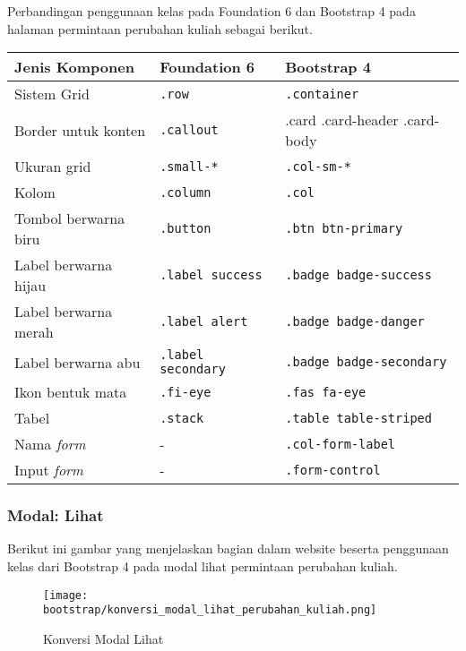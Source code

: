 \noindent Perbandingan penggunaan kelas pada Foundation 6 dan Bootstrap 4 pada halaman permintaan perubahan kuliah sebagai berikut.\\
\begin{tabular}{| p{} | p{} | p{} |} 
	\hline
	\textbf{Jenis Komponen} & \textbf{Foundation 6} & \textbf{Bootstrap 4}  \\ [0.5ex] 
	\hline	
	Sistem Grid & \texttt{.row} &   \texttt{.container} \\ 
	\hline	
	Border untuk konten & \texttt{.callout} &  .card \newline .card-header \newline .card-body \\
	\hline	
	Ukuran grid & \texttt{.small-*} &  \texttt{.col-sm-*} \\
	\hline
	Kolom & \texttt{.column} &  \texttt{.col} \\	
	\hline	
	Tombol berwarna biru & \texttt{.button} &  \texttt{.btn btn-primary}\\
	\hline	
	Label berwarna hijau & \texttt{.label success } & \texttt{.badge badge-success} \\
	\hline	
	Label berwarna merah & \texttt{.label alert} & \texttt{.badge badge-danger}  \\
	\hline	
	Label berwarna abu & \texttt{.label secondary} & \texttt{.badge badge-secondary}  \\
	\hline	
	Ikon bentuk mata & \texttt{.fi-eye} &  \texttt{.fas fa-eye} \\	
	\hline	
	Tabel & \texttt{.stack} & \texttt{.table table-striped}  \\
	\hline	
	Nama \textit{form} & - & \texttt{.col-form-label}  \\ 
	\hline	
	Input \textit{form} & - & \texttt{.form-control}  \\ [1ex] 
	\hline
\end{tabular}

\subsubsection{Modal: Lihat}

\noindent Berikut ini gambar yang menjelaskan bagian dalam website beserta penggunaan kelas dari Bootstrap 4 pada modal lihat permintaan perubahan kuliah.\\
\begin{figure} [H]
	\centering  
	\texttt{[image: bootstrap/konversi\_modal\_lihat\_perubahan\_kuliah.png]}
	\caption{Konversi Modal Lihat}
\end{figure}

